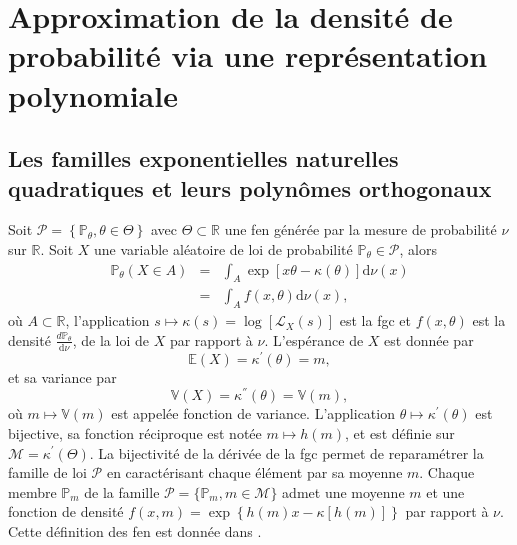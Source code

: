 
\chapter{Approximation de la densité de probabilité via une représentation polynomiale}\label{Chapter2}

	\minitoc
	\newpage



\section{Les familles exponentielles naturelles quadratiques et leurs polynômes orthogonaux}\label{Chapter2Section1}
Soit $\mathcal{P}=\left\{\mathbb{P}_{\theta},\theta\in\Theta\right\}$ avec $\Theta\subset\mathbb{R}$ une \gls{fen} générée par la mesure de probabilité $\nu$ sur $\mathbb{R}$. Soit $X$ une variable aléatoire de loi de probabilité $\mathbb{P}_{\theta}\in \mathcal{P}$, alors 
\begin{eqnarray*}
\mathbb{P}_{\theta}(X\in A)&=&\int_{A}\exp\left[x\theta-\kappa(\theta)\right]\text{d}\nu(x)\\
&=&\int_{A}f(x,\theta)\text{d}\nu(x),
\end{eqnarray*}		
où $A\subset\mathbb{R}$, l'application $s\mapsto \kappa(s)=\log\left[\mathcal{L}_{X}(s)\right]$ est la \gls{fgc} et $f(x,\theta)$ est la densité $\frac{d\mathbb{P}_{\theta}}{\text{d}\nu}$, de la loi de $X$ par rapport à $\nu$. L'espérance de $X$ est donnée par  
\begin{equation*}
\mathbb{E}(X)=\kappa^{'}(\theta)=m,
\end{equation*} 
et sa variance par
\begin{equation*}
\mathbb{V}(X)=\kappa^{''}(\theta)=\mathbb{V}(m),
\end{equation*}
où $m\mapsto \mathbb{V}(m)$ est appelée fonction de variance. L'application $\theta\mapsto\kappa^{'}(\theta)$ est bijective, sa fonction réciproque est notée $m\mapsto h(m)$, et est définie sur $\mathcal{M}=\kappa^{'}(\Theta)$. La bijectivité de la dérivée de la \gls{fgc} permet de reparamétrer la famille de loi $\mathcal{P}$ en caractérisant chaque élément par sa moyenne $m$. Chaque membre $\mathbb{P}_{m}$ de la famille $\mathcal{P}=\{\mathbb{P}_{m},m\in\mathcal{M}\}$ admet une moyenne $m$ et une fonction de densité $f(x,m)=\exp\left\{h(m)x-\kappa\left[h(m)\right]\right\}$ par rapport à $\nu$. Cette définition des \gls{fen} est donnée dans \citet{Ba78}.\\

